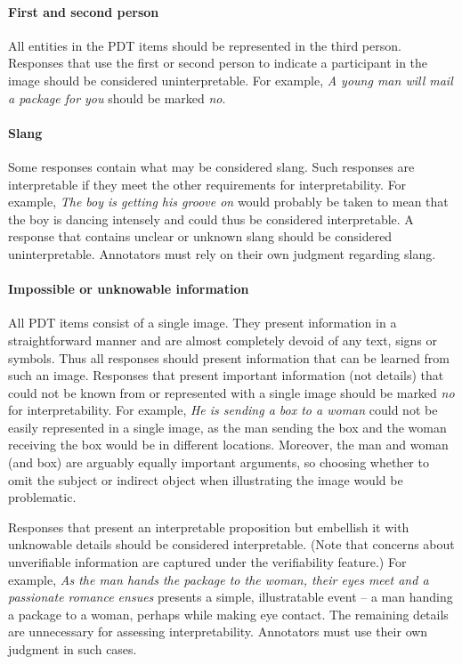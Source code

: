 \documentclass[12pt]{article}
\begin{document}
\paragraph{First and second person} All entities in the PDT items should be represented in the third person. Responses that use the first or second person to indicate a participant in the image should be considered uninterpretable. For example, \textit{A young man will mail a package for you} should be marked \textit{no}. 

\paragraph{Slang} Some responses contain what may be considered slang. Such responses are interpretable if they meet the other requirements for interpretability. For example, \textit{The boy is getting his groove on} would probably be taken to mean that the boy is dancing intensely and could thus be considered interpretable. A response that contains unclear or unknown slang should be considered uninterpretable. Annotators must rely on their own judgment regarding slang.

\paragraph{Impossible or unknowable information} All PDT items consist of a single image. They present information in a straightforward manner and are almost completely devoid of any text, signs or symbols. Thus all responses should present information that can be learned from such an image. Responses that present important information (not details) that could not be known from or represented with a single image should be marked \textit{no} for interpretability. For example, \textit{He is sending a box to a woman} could not be easily represented in a single image, as the man sending the box and the woman receiving the box would be in different locations. Moreover, the man and woman (and box) are arguably equally important arguments, so choosing whether to omit the subject or indirect object when illustrating the image would be problematic.

Responses that present an interpretable proposition but embellish it with unknowable details should be considered interpretable. (Note that concerns about unverifiable information are captured under the verifiability feature.) For example, \textit{As the man hands the package to the woman, their eyes meet and a passionate romance ensues} presents a simple, illustratable event -- a man handing a package to a woman, perhaps while making eye contact. The remaining details are unnecessary for assessing interpretability. Annotators must use their own judgment in such cases.
\end{document}
